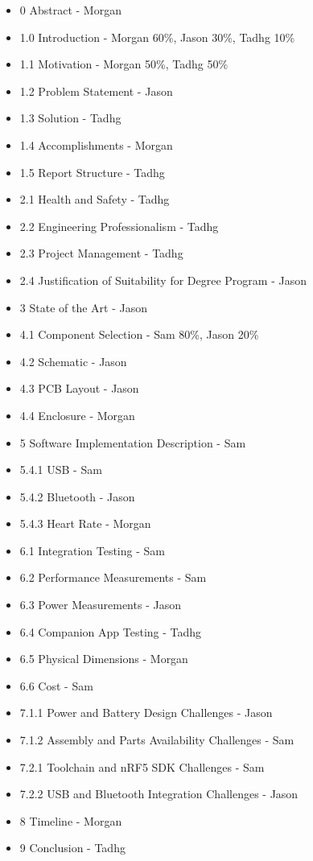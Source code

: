 \begin{itemize}
    \item 0 Abstract - Morgan
    \item 1.0 Introduction - Morgan 60\%, Jason 30\%, Tadhg 10\%
    \item 1.1 Motivation - Morgan 50\%, Tadhg 50\%
    \item 1.2 Problem Statement - Jason
    \item 1.3 Solution - Tadhg
    \item 1.4 Accomplishments - Morgan
    \item 1.5 Report Structure - Tadhg
    \item 2.1 Health and Safety - Tadhg
    \item 2.2 Engineering Professionalism - Tadhg
    \item 2.3 Project Management - Tadhg
    \item 2.4 Justification of Suitability for Degree Program - Jason
    \item 3 State of the Art - Jason
    \item 4.1 Component Selection - Sam 80\%, Jason 20\%
    \item 4.2 Schematic - Jason
    \item 4.3 PCB Layout - Jason
    \item 4.4 Enclosure - Morgan
    \item 5 Software Implementation Description - Sam
    \item 5.4.1 USB - Sam
    \item 5.4.2 Bluetooth - Jason
    \item 5.4.3 Heart Rate - Morgan
    \item 6.1 Integration Testing - Sam
    \item 6.2 Performance Measurements - Sam
    \item 6.3 Power Measurements - Jason
    \item 6.4 Companion App Testing - Tadhg
    \item 6.5 Physical Dimensions - Morgan
    \item 6.6 Cost - Sam
    \item 7.1.1 Power and Battery Design Challenges - Jason
    \item 7.1.2 Assembly and Parts Availability Challenges - Sam
    \item 7.2.1 Toolchain and nRF5 SDK Challenges - Sam
    \item 7.2.2 USB and Bluetooth Integration Challenges - Jason
    \item 8 Timeline - Morgan
    \item 9 Conclusion - Tadhg
\end{itemize}
